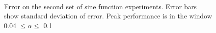\documentclass[a4paper,11pt]{article}
\begin{document}
    \begin{figure}
    \\
    \caption{Error on the second set of sine function experiments. Error bars show
    standard deviation of error. Peak performance is in the window 0.04
    $\leq\alpha\leq$ 0.1}
    \label{fig:fineerror}
    \end{figure}
\end{document}
